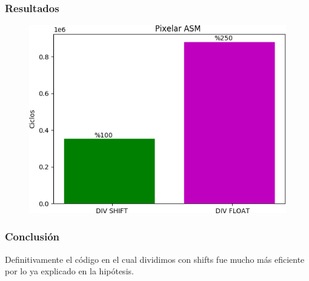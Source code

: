 \subsubsection{Resultados}
\begin{figure}[H]
	\centering
	\includegraphics[width = 10 cm, height = 6 cm]{imagenes/Div_pixelar.png}
	\caption[center]{}
\end{figure}
	
\subsubsection{Conclusión}
\par{Definitivamente el código en el cual dividimos con shifts fue mucho más eficiente por lo ya explicado en la hipótesis.}